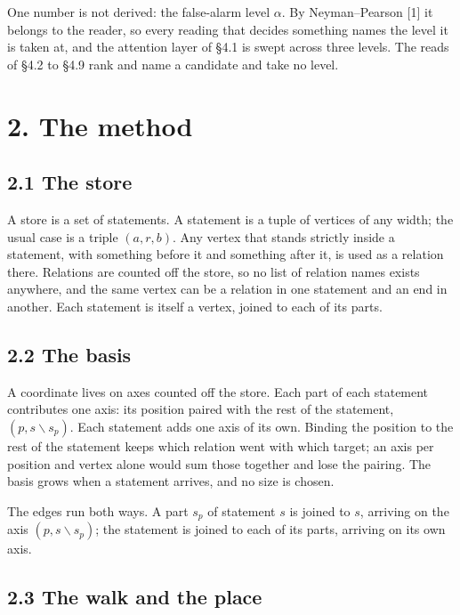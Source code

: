 \documentclass[10pt,letterpaper,twocolumn]{article}
\begin{document}
One number is not derived: the false-alarm level \(\alpha\). By Neyman--Pearson {[}1{]} it belongs to the
reader, so every reading that decides something names the level it is taken at, and the attention
layer of §4.1 is swept across three levels. The reads of §4.2 to §4.9 rank and name a candidate and
take no level.

\section{2. The method}\label{2-the-method}

\subsection{2.1 The store}\label{21-the-store}

A store is a set of statements. A statement is a tuple of vertices of any width; the usual case is a
triple \((a, r, b)\). Any vertex that stands strictly inside a statement, with something before it and
something after it, is used as a relation there. Relations are counted off the store, so no list of
relation names exists anywhere, and the same vertex can be a relation in one statement and an end in
another. Each statement is itself a vertex, joined to each of its parts.

\subsection{2.2 The basis}\label{22-the-basis}

A coordinate lives on axes counted off the store. Each part of each statement contributes one axis:
its position paired with the rest of the statement, \((p, s \smallsetminus s_p)\). Each statement adds one
axis of its own. Binding the position to the rest of the statement keeps which relation went with
which target; an axis per position and vertex alone would sum those together and lose the pairing.
The basis grows when a statement arrives, and no size is chosen.

The edges run both ways. A part \(s_p\) of statement \(s\) is joined to \(s\), arriving on the axis
\((p, s \smallsetminus s_p)\); the statement is joined to each of its parts, arriving on its own axis.

\subsection{2.3 The walk and the place}\label{23-the-walk-and-the-place}
\end{document}

